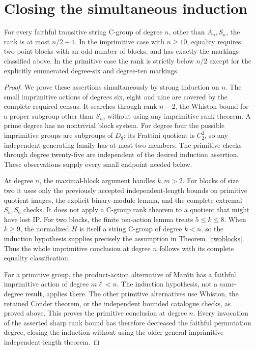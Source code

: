 \section{Closing the simultaneous induction}
\begin{theorem}\label{sharpclosure}
For every faithful transitive string C-group of degree $n$, other than
$A_n,S_n$, the rank is at most $n/2+1$. In the imprimitive case with
$n\geq10$, equality requires two-point blocks with an odd number of
blocks, and has exactly the markings classified above. In the primitive
case the rank is strictly below $n/2$ except for the explicitly enumerated
degree-six and degree-ten markings.
\end{theorem}
\begin{proof}
We prove these assertions simultaneously by strong induction on $n$.
The small imprimitive actions of degrees six, eight and nine are covered
by the complete required census. It searches through rank $n-2$, the
Whiston bound for a proper subgroup other than $S_n$, without using any
imprimitive rank theorem. A prime degree has no nontrivial block system.
For degree four the possible imprimitive groups are subgroups of $D_8$;
its Frattini quotient is $C_2^2$, so any independent generating family
has at most two members. The primitive checks through degree twenty-five
are independent of the desired induction assertion. These observations
supply every small endpoint needed below.

At degree $n$, the maximal-block argument handles $k,m>2$. For blocks
of size two it uses only the previously accepted independent-length
bounds on primitive quotient images, the explicit binary-module lemma,
and the complete extremal $S_5,S_6$ checks. It does not apply a C-group
rank theorem to a quotient that might have lost IP. For two blocks, the
finite ten-action lemma treats $5\leq k\leq8$. When $k\geq9$, the
normalized $H$ is itself a string C-group of degree $k<n$, so the
induction hypothesis supplies precisely the assumption in
Theorem~\ref{twoblocks}. Thus the whole imprimitive conclusion at degree
$n$ follows with its complete equality classification.

For a primitive group, the product-action alternative of Mar\'oti has
a faithful imprimitive action of degree $m\ell<n$. The induction
hypothesis, not a same-degree result, applies there. The other primitive
alternatives use Whiston, the retained Conder theorem, or the independent
bounded catalogue checks, as proved above. This proves the primitive
conclusion at degree $n$. Every invocation of the asserted sharp rank
bound has therefore decreased the faithful permutation degree, closing
the induction without using the older general imprimitive
independent-length theorem.
\end{proof}
